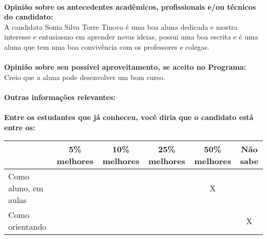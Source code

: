 \documentclass[11pt]{article}
\begin{document}
\\
\textbf{Opinião sobre os antecedentes acadêmicos, profissionais e/ou técnicos do candidato:}
\\A candidata Sonia Silva Torre Tinoco é uma boa aluna dedicada e mostra interesse e entusiasmo em aprender novas ideias, possui uma boa escrita e é uma aluna que tem uma boa convivência com os professores e colegas.\\
\\
\textbf{Opinião sobre seu possível aproveitamento, se aceito no Programa:}
\\Creio que a aluna pode desenvolver um bom curso.\\ 
\\
\textbf{Outras informações relevantes:} \\
\\[0.3cm]
\textbf{Entre os estudantes que já conheceu, você diria que o candidato está entre os:}
\\
\begin{tabular}{|l|c|c|c|c|c|}
\hline
 & 5\% melhores & 10\% melhores & 25\% melhores & 50\% melhores & Não sabe \\
\hline
Como aluno, em aulas &  &  &  & X & \\
\hline
Como orientando &  &  &  &  & X\\
\hline
\end{tabular}
\end{document}
